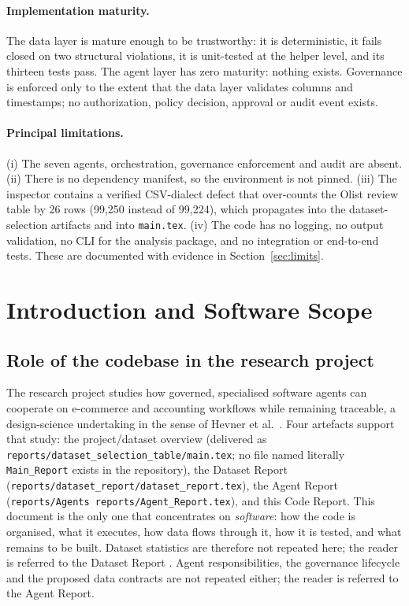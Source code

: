 \documentclass[11pt,a4paper]{article}
\newcommand{\code}[1]{\texttt{#1}}
\begin{document}
\paragraph{Implementation maturity.} The data layer is mature enough to be trustworthy: it is deterministic, it fails closed on two structural violations, it is unit-tested at the helper level, and its thirteen tests pass. The agent layer has zero maturity: nothing exists. Governance is enforced only to the extent that the data layer validates columns and timestamps; no authorization, policy decision, approval or audit event exists.

\paragraph{Principal limitations.} (i) The seven agents, orchestration, governance enforcement and audit are absent. (ii) There is no dependency manifest, so the environment is not pinned. (iii) The inspector contains a verified CSV-dialect defect that over-counts the Olist review table by 26 rows (99{,}250 instead of 99{,}224), which propagates into the dataset-selection artifacts and into \code{main.tex}. (iv) The code has no logging, no output validation, no CLI for the analysis package, and no integration or end-to-end tests. These are documented with evidence in Section~\ref{sec:limits}.

\section{Introduction and Software Scope}
\label{sec:scope}
\subsection{Role of the codebase in the research project}
The research project studies how governed, specialised software agents can cooperate on e-commerce and accounting workflows while remaining traceable, a design-science undertaking in the sense of Hevner et al.~\cite{hevner2004}. Four artefacts support that study: the project/dataset overview (delivered as \code{reports/dataset\_selection\_table/main.tex}; no file named literally \code{Main\_Report} exists in the repository), the Dataset Report (\code{reports/dataset\_report/dataset\_report.tex}), the Agent Report (\code{reports/Agents reports/Agent\_Report.tex}), and this Code Report. This document is the only one that concentrates on \emph{software}: how the code is organised, what it executes, how data flows through it, how it is tested, and what remains to be built. Dataset statistics are therefore not repeated here; the reader is referred to the Dataset Report \cite{olistDataset,chen2012}. Agent responsibilities, the governance lifecycle and the proposed data contracts are not repeated either; the reader is referred to the Agent Report.
\end{document}
